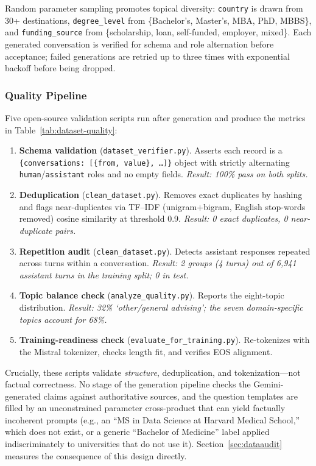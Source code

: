 \documentclass[11pt, a4paper]{article}
\begin{document}
Random parameter sampling promotes topical diversity: \texttt{country} is drawn from 30+ destinations, \texttt{degree\_level} from \{Bachelor's, Master's, MBA, PhD, MBBS\}, and \texttt{funding\_source} from \{scholarship, loan, self-funded, employer, mixed\}. Each generated conversation is verified for schema and role alternation before acceptance; failed generations are retried up to three times with exponential backoff before being dropped.

\subsubsection{Quality Pipeline}
Five open-source validation scripts run after generation and produce the metrics in Table~\ref{tab:dataset-quality}:

\begin{enumerate}
    \item \textbf{Schema validation} (\texttt{dataset\_verifier.py}). Asserts each record is a \texttt{\{conversations: [\{from, value\}, \ldots]\}} object with strictly alternating \texttt{human}/\texttt{assistant} roles and no empty fields. \emph{Result: 100\% pass on both splits.}
    \item \textbf{Deduplication} (\texttt{clean\_dataset.py}). Removes exact duplicates by hashing and flags near-duplicates via TF--IDF (unigram+bigram, English stop-words removed) cosine similarity at threshold 0.9. \emph{Result: 0 exact duplicates, 0 near-duplicate pairs.}
    \item \textbf{Repetition audit} (\texttt{clean\_dataset.py}). Detects assistant responses repeated across turns within a conversation. \emph{Result: 2 groups (4 turns) out of 6{,}941 assistant turns in the training split; 0 in test.}
    \item \textbf{Topic balance check} (\texttt{analyze\_quality.py}). Reports the eight-topic distribution. \emph{Result: 32\% `other/general advising'; the seven domain-specific topics account for 68\%.}
    \item \textbf{Training-readiness check} (\texttt{evaluate\_for\_training.py}). Re-tokenizes with the Mistral tokenizer, checks length fit, and verifies EOS alignment.
\end{enumerate}

Crucially, these scripts validate \emph{structure}, deduplication, and tokenization---not factual correctness. No stage of the generation pipeline checks the Gemini-generated claims against authoritative sources, and the question templates are filled by an unconstrained parameter cross-product that can yield factually incoherent prompts (e.g., an ``MS in Data Science at Harvard Medical School,'' which does not exist, or a generic ``Bachelor of Medicine'' label applied indiscriminately to universities that do not use it). Section~\ref{sec:dataaudit} measures the consequence of this design directly.
\end{document}
